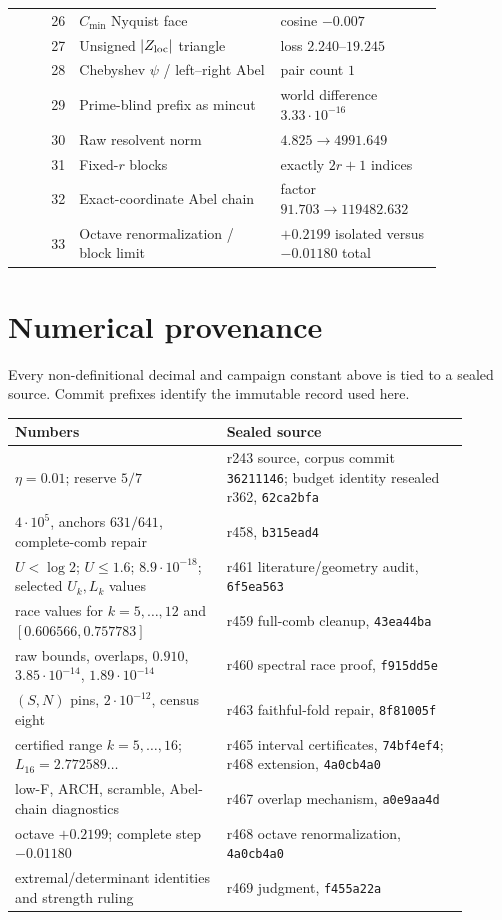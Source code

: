 \documentclass[11pt]{article}
\begin{document}
\begin{longtable}{@{}r p{0.47\linewidth} p{0.38\linewidth}@{}}
26 & $C_{\min}$ Nyquist face & cosine $-0.007$\\
27 & Unsigned $|Z_{\rm loc}|$ triangle & loss $2.240$--$19.245$\\
28 & Chebyshev $\psi$ / left--right Abel & pair count $1$\\
29 & Prime-blind prefix as mincut & world difference $3.33\cdot10^{-16}$\\
30 & Raw resolvent norm & $4.825\to4991.649$\\
31 & Fixed-$r$ blocks & exactly $2r+1$ indices\\
32 & Exact-coordinate Abel chain & factor $91.703\to119482.632$\\
33 & Octave renormalization / block limit & $+0.2199$ isolated versus $-0.01180$ total\\
\bottomrule
\end{longtable}
\normalsize

\section{Numerical provenance}

Every non-definitional decimal and campaign constant above is tied
to a sealed source.  Commit prefixes identify the immutable record
used here.
\begin{center}
\small
\begin{tabular}{@{}p{0.42\linewidth}p{0.48\linewidth}@{}}
\toprule
Numbers & Sealed source\\
\midrule
$\eta=0.01$; reserve $5/7$ &
r243 source, corpus commit \texttt{36211146};
budget identity resealed r362, \texttt{62ca2bfa}\\
$4\cdot10^5$, anchors $631/641$, complete-comb repair &
r458, \texttt{b315ead4}\\
$U<\log2$; $U\le1.6$; $8.9\cdot10^{-18}$;
selected $U_k,L_k$ values &
r461 literature/geometry audit, \texttt{6f5ea563}\\
race values for $k=5,\ldots,12$ and
$[0.606566,0.757783]$ &
r459 full-comb cleanup, \texttt{43ea44ba}\\
raw bounds, overlaps, $0.910$, $3.85\cdot10^{-14}$,
$1.89\cdot10^{-14}$ &
r460 spectral race proof, \texttt{f915dd5e}\\
$(S,N)$ pins, $2\cdot10^{-12}$, census eight &
r463 faithful-fold repair, \texttt{8f81005f}\\
certified range $k=5,\ldots,16$; $L_{16}=2.772589\ldots$ &
r465 interval certificates, \texttt{74bf4ef4};
r468 extension, \texttt{4a0cb4a0}\\
low-F, ARCH, scramble, Abel-chain diagnostics &
r467 overlap mechanism, \texttt{a0e9aa4d}\\
octave $+0.2199$; complete step $-0.01180$ &
r468 octave renormalization, \texttt{4a0cb4a0}\\
extremal/determinant identities and strength ruling &
r469 judgment, \texttt{f455a22a}\\
\bottomrule
\end{tabular}
\end{center}
\end{document}
